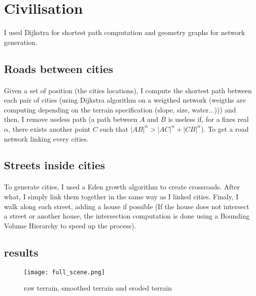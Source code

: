 \documentclass[a4paper,12pt]{article}
\begin{document}
\section*{Civilisation}

\paragraph{} I used Dijkstra for shortest path computation and geometry graphs for network generation.

\subsection*{Roads between cities}

\paragraph{} Given a set of position (the cities locations), I compute the shortest path between each pair of cities (using Dijkstra algorithm on a weigthed network (weigths are computing depending on the terrain specification (slope, size, water...))) and then, I remove useless path (a path between $A$ and $B$ is useless if, for a fixes real $\alpha$, there exists another point $C$ such that $\left| AB \right|^\alpha > \left| AC \right|^\alpha + \left| CB \right|^\alpha$). To get a road network linking every cities.

\subsection*{Streets inside cities}

\paragraph{} To generate cities, I used a Eden growth algorithm to create crossroads. After what, I simply link them together in the same way as I linked cities. Finaly, I walk along each street, adding a house if possible (If the house does not intersect a street or another house, the intersection computation is done using a Bounding Volume Hierarchy to speed up the process).

\subsection*{results}

\begin{figure}[!h]
  \centering
  \texttt{[image: full\_scene.png]}{}
  \caption{raw terrain, smoothed terrain and eroded terrain}
\end{figure}
\end{document}
